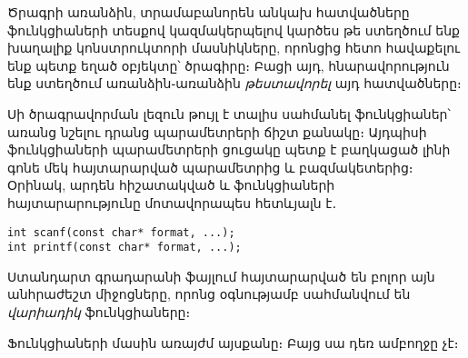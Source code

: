 Ծրագրի առանձին, տրամաբանորեն անկախ հատվածները ֆունկցիաների տեսքով
կազմակերպելով կարծես թե ստեղծում ենք խաղալիք կոնստրուկտորի մասնիկները,
որոնցից հետո հավաքելու ենք պետք եղած օբյեկտը՝ ծրագիրը։ Բացի այդ,
հնարավորություն ենք ստեղծում առանձին֊առանձին \emph{թեստավորել} այդ
հատվածները։


Սի ծրագրավորման լեզուն թույլ է տալիս սահմանել ֆունկցիաներ՝ առանց նշելու
դրանց պարամետրերի ճիշտ քանակը։ Այդպիսի ֆունկցիաների պարամետրերի ցուցակը
պետք է բաղկացած լինի գոնե մեկ հայտարարված պարամետրից և բազմակետերից։
Օրինակ, արդեն հիշատակված  և  ֆունկցիաների
հայտարարությունը մոտավորապես հետևյալն է․

\begin{Verbatim}
int scanf(const char* format, ...);
int printf(const char* format, ...);
\end{Verbatim}

Ստանդարտ գրադարանի  ֆայլում հայտարարված են բոլոր այն
անհրաժեշտ միջոցները, որոնց օգնությամբ սահմանվում են \emph{վարիադիկ}
ֆունկցիաները։

Ֆունկցիաների մասին առայժմ այսքանը։ Բայց սա դեռ ամբողջը չէ։
